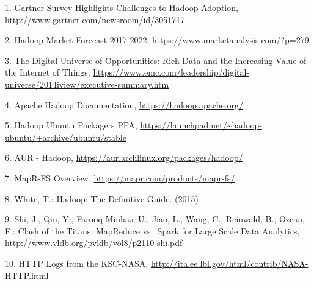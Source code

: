 \documentclass[italian,a4paper, twoside, 12pt]{report}
\begin{document}
\hypertarget{refs}{}
\hypertarget{ref-hadoop-adoption-survey}{}
1. Gartner Survey Highlights Challenges to Hadoop Adoption,
\url{http://www.gartner.com/newsroom/id/3051717}

\hypertarget{ref-hadoop-market-analysis}{}
2. Hadoop Market Forecast 2017-2022,
\url{https://www.marketanalysis.com/?p=279}

\hypertarget{ref-digital-univ}{}
3. The Digital Universe of Opportunities: Rich Data and the Increasing
Value of the Internet of Things,
\url{https://www.emc.com/leadership/digital-universe/2014iview/executive-summary.htm}

\hypertarget{ref-hadoop-doc-main}{}
4. Apache Hadoop Documentation, \url{https://hadoop.apache.org/}

\hypertarget{ref-hadoop-ppa}{}
5. Hadoop Ubuntu Packagers PPA,
\url{https://launchpad.net/~hadoop-ubuntu/+archive/ubuntu/stable}

\hypertarget{ref-hadoop-aur}{}
6. AUR - Hadoop, \url{https://aur.archlinux.org/packages/hadoop/}

\hypertarget{ref-mapr-fs}{}
7. MapR-FS Overview, \url{https://mapr.com/products/mapr-fs/}

\hypertarget{ref-hadoop-guide-hdfs-file-read}{}
8. White, T.: Hadoop: The Definitive Guide. (2015)

\hypertarget{ref-mapreduce-spark-performance}{}
9. Shi, J., Qiu, Y., Farooq Minhas, U., Jiao, L., Wang, C., Reinwald,
B., Ozcan, F.: Clash of the Titans: MapReduce vs.~Spark for Large Scale
Data Analytics, \url{http://www.vldb.org/pvldb/vol8/p2110-shi.pdf}

\hypertarget{ref-nasa-weblog}{}
10. HTTP Logs from the KSC-NASA,
\url{http://ita.ee.lbl.gov/html/contrib/NASA-HTTP.html}
\end{document}
